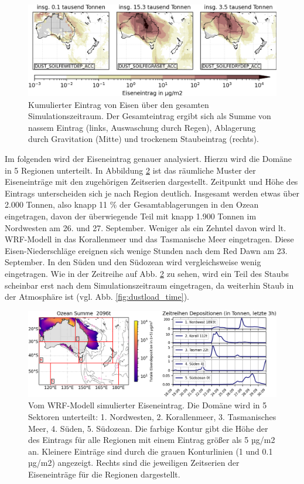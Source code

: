 \documentclass[12pt,a4paper,onecolumn,headheight=30pt]{scrartcl}
\begin{document}
\begin{figure}[htbp]
\includegraphics[width=\textwidth]{bilder/iron_deposition_vars.png}
\caption{Kumulierter Eintrag von Eisen über den gesamten Simulationszeitraum. Der Gesamteintrag ergibt sich als Summe von nassem Eintrag (links, Auswaschung durch Regen), Ablagerung durch Gravitation (Mitte) und trockenem Staubeintrag (rechts).} \label{fig:iron_deposition}
\end{figure}
Im folgenden wird der Eiseneintrag genauer analysiert. Hierzu wird die Domäne in 5 Regionen unterteilt. In Abbildung \ref{fig:iron_deposition_sections} ist das räumliche Muster der Eiseneinträge mit den zugehörigen Zeitserien dargestellt. Zeitpunkt und Höhe des Eintrags unterscheiden sich je nach Region deutlich. Insgesamt werden etwas über 2.000 Tonnen, also knapp 11 \% der Gesamtablagerungen in den Ozean eingetragen, davon der überwiegende Teil mit knapp 1.900 Tonnen im Nordwesten am 26. und 27. September. Weniger als ein Zehntel davon wird lt. WRF-Modell in das Korallenmeer und das Tasmanische Meer eingetragen. Diese Eisen-Niederschläge ereignen sich wenige Stunden nach dem Red Dawn am 23. September. In den Süden und den Südozean wird vergleichsweise wenig eingetragen. Wie in der Zeitreihe auf Abb. \ref{fig:iron_deposition_sections} zu sehen, wird ein Teil des Staubs scheinbar erst nach dem Simulationszeitraum eingetragen, da weiterhin Staub in der Atmosphäre ist (vgl. Abb. \ref{fig:dustload_time}).
\begin{figure}[htbp]
\includegraphics[width=\textwidth]{bilder/total_iron.png}
\caption{Vom WRF-Modell simulierter Eiseneintrag. Die Domäne wird in 5 Sektoren unterteilt: 1. Nordwesten, 2. Korallenmeer, 3. Tasmanisches Meer, 4. Süden, 5. Südozean. Die farbige Kontur gibt die Höhe der des Eintrags für alle Regionen mit einem Eintrag größer als 5 µg/m2 an. Kleinere Einträge sind durch die grauen Konturlinien (1 und 0.1 µg/m2) angezeigt. Rechts sind die jeweiligen Zeitserien der Eiseneinträge für die Regionen dargestellt.} \label{fig:iron_deposition_sections}
\end{figure}
\end{document}
